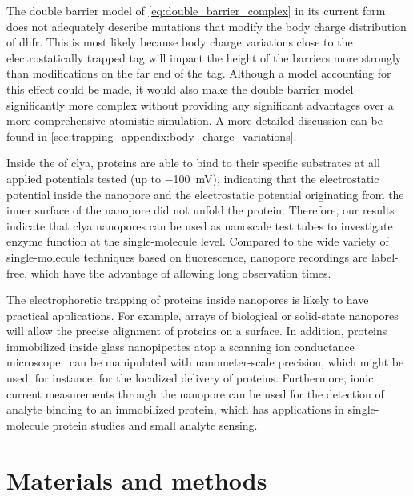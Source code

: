 The double barrier model of \cref{eq:double_barrier_complex} in its current form does not adequately describe
mutations that modify the body charge distribution of \gls{dhfr}\@. This is most likely because body charge
variations close to the electrostatically trapped tag will impact the height of the barriers more strongly
than modifications on the far end of the tag. Although a model accounting for this effect could be made, it
would also make the double barrier model significantly more complex without providing any significant
advantages over a more comprehensive atomistic simulation. A more detailed discussion can be found in
\cref{sec:trapping_appendix:body_charge_variations}.

Inside the \lumen{} of \gls{clya}, proteins are able to bind to their specific substrates at all applied
potentials tested (up to \SI{-100}{\mV}), indicating that the electrostatic potential inside the nanopore and
the electrostatic potential originating from the inner surface of the nanopore did not unfold the protein.
Therefore, our results indicate that \gls{clya} nanopores can be used as nanoscale test tubes to investigate
enzyme function at the single-molecule level. Compared to the wide variety of single-molecule techniques based
on fluorescence, nanopore recordings are label-free, which have the advantage of allowing long observation
times.

The electrophoretic trapping of proteins inside nanopores is likely to have practical applications. For
example, arrays of biological or solid-state nanopores will allow the precise alignment of proteins on a
surface. In addition, proteins immobilized inside glass nanopipettes atop a scanning ion conductance
microscope~\cite{Bruckbauer-2007,Babakinejad-2013} can be manipulated with nanometer-scale precision, which
might be used, for instance, for the localized delivery of proteins. Furthermore, ionic current measurements
through the nanopore can be used for the detection of analyte binding to an immobilized protein, which has
applications in single-molecule protein studies and small analyte sensing.


%
\section{Materials and methods}
%
\label{sec:trapping:methods}
%

